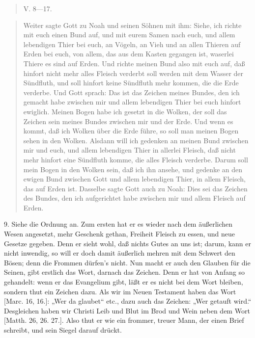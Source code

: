 \begin{quote}
V. 8—17.
\end{quote}

\begin{quote}
Weiter sagte Gott zu Noah und seinen Söhnen mit ihm: Siehe, ich richte mit euch einen Bund auf, und mit eurem Samen nach euch, und allem lebendigen Thier bei euch, an Vögeln, an Vieh und an allen Thieren auf Erden bei euch, von allem, das aus dem Kasten gegangen ist, waserlei Thiere es sind auf Erden. Und richte meinen Bund also mit euch auf, daß hinfort nicht mehr alles Fleisch verderbt soll werden mit dem Wasser der Sündfluth, und soll hinfort keine Sündfluth mehr kommen, die die Erde verderbe. Und Gott sprach: Das ist das Zeichen meines Bundes, den ich gemacht habe zwischen mir und allem lebendigen Thier bei euch hinfort ewiglich. Meinen Bogen habe ich gesetzt in die Wolken, der soll das Zeichen sein meines Bundes zwischen mir und der Erde. Und wenn es kommt, daß ich Wolken über die Erde führe, so soll man meinen Bogen sehen in den Wolken. Alsdann will ich gedenken an meinen Bund zwischen mir und euch, und allem lebendigen Thier in allerlei Fleisch, daß nicht mehr hinfort eine Sündfluth komme, die alles Fleisch verderbe. Darum soll mein Bogen in den Wolken sein, daß ich ihn ansehe, und gedenke an den ewigen Bund zwischen Gott und allem lebendigen Thier, in allem Fleisch, das auf Erden ist. Dasselbe sagte Gott auch zu Noah: Dies sei das Zeichen des Bundes, den ich aufgerichtet habe zwischen mir und allem Fleisch auf Erden.
\end{quote}

9. Siehe die Ordnung an. Zum ersten hat er es wieder nach dem äußerlichen Wesen angesetzt, mehr Geschenk gethan, Freiheit Fleisch zu essen, und neue Gesetze gegeben. Denn er sieht wohl, daß nichts Gutes an uns ist; darum, kann er nicht inwendig, so will er doch damit äußerlich mehren mit dem Schwert den Bösen; denn die Frommen dürfen’s nicht. Nun macht er auch den Glauben für die Seinen, gibt erstlich das Wort, darnach das Zeichen. Denn er hat von Anfang so gehandelt: wenn er das Evangelium gibt, läßt er es nicht bei dem Wort bleiben, sondern thut ein Zeichen dazu. Als wir im Neuen Testament haben das Wort [Marc. 16, 16.]: „Wer da glaubet“ etc., dazu auch das Zeichen: „Wer getauft wird.“ Desgleichen haben wir Christi Leib und Blut im Brod und Wein neben dem Wort [Matth. 26, 26. 27.]. Also thut er wie ein frommer, treuer Mann, der einen Brief schreibt, und sein Siegel darauf drückt.

